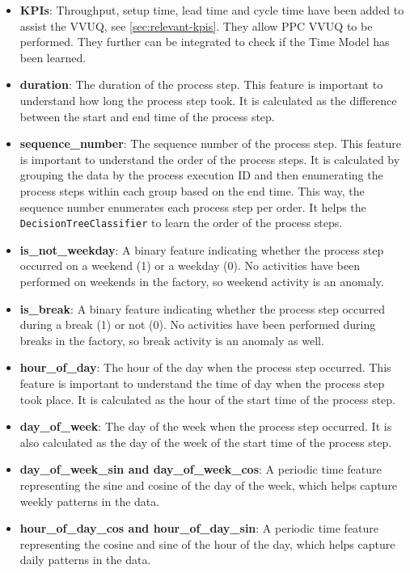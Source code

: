 \begin{itemize}
  \item \textbf{KPIs}: Throughput, setup time, lead time and cycle time have been added to assist the VVUQ, see \autoref{sec:relevant-kpis}. They allow PPC VVUQ to be performed. They further can be integrated to check if the Time Model has been learned.
  \item \textbf{duration}: The duration of the process step. This feature is important to understand how long the process step took. It is calculated as the difference between the start and end time of the process step.
  \item \textbf{sequence\_number}: The sequence number of the process step. This feature is important to understand the order of the process steps. It is calculated by grouping the data by the process execution ID and then enumerating the process steps within each group based on the end time. This way, the sequence number enumerates each process step per order. It helps the \texttt{DecisionTreeClassifier} to learn the order of the process steps.
  \item \textbf{is\_not\_weekday}: A binary feature indicating whether the process step occurred on a weekend (1) or a weekday (0). No activities have been performed on weekends in the factory, so weekend activity is an anomaly.
  \item \textbf{is\_break}: A binary feature indicating whether the process step occurred during a break (1) or not (0). No activities have been performed during breaks in the factory, so break activity is an anomaly as well.
  \item \textbf{hour\_of\_day}: The hour of the day when the process step occurred. This feature is important to understand the time of day when the process step took place. It is calculated as the hour of the start time of the process step.
  \item \textbf{day\_of\_week}: The day of the week when the process step occurred. It is also calculated as the day of the week of the start time of the process step.
  \item \textbf{day\_of\_week\_sin and day\_of\_week\_cos}: A periodic time feature representing the sine and cosine of the day of the week, which helps capture weekly patterns in the data.
  \item \textbf{hour\_of\_day\_cos and hour\_of\_day\_sin}: A periodic time feature representing the cosine and sine of the hour of the day, which helps capture daily patterns in the data.
\end{itemize}

